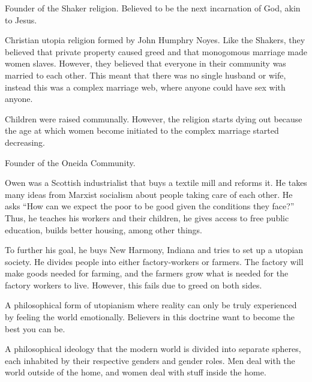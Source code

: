 \begin{description}
\begin{description}[noitemsep]
  \item[Ann Lee] Founder of the Shaker religion.
    Believed to be the next incarnation of God, akin to Jesus.

  \item[Oneida Community] Christian utopia religion formed by John Humphry Noyes.
    Like the Shakers, they believed that private property caused greed and that monogomous marriage made women slaves.
    However, they believed that everyone in their community was married to each other.
    This meant that there was no single husband or wife, instead this was a complex marriage web, where anyone could have sex with anyone.

    Children were raised communally.
    However, the religion starts dying out because the age at which women become initiated to the complex marriage started decreasing.

  \item[John Humphry Noyes] Founder of the Oneida Community.

  \item[Robert Owen] Owen was a Scottish industrialist that buys a textile mill and reforms it.
    He takes many ideas from Marxist socialism about people taking care of each other.
    He asks ``How can we expect the poor to be good given the conditions they face?''
    Thus, he teaches his workers and their children, he gives access to free public education, builds better housing, among other things.

    To further his goal, he buys New Harmony, Indiana and tries to set up a utopian society.
    He divides people into either factory-workers or farmers.
    The factory will make goods needed for farming, and the farmers grow what is needed for the factory workers to live.
    However, this fails due to greed on both sides.

  \item[Transcendentalism] A philosophical form of utopianism where reality can only be truly experienced by feeling the world emotionally.
    Believers in this doctrine want to become the best you can be.

  \item[Separate Spheres] A philosophical ideology that the modern world is divided into separate spheres, each inhabited by their respective genders and gender roles.
    Men deal with the world outside of the home, and women deal with stuff inside the home.
  \end{description}


\end{description}
